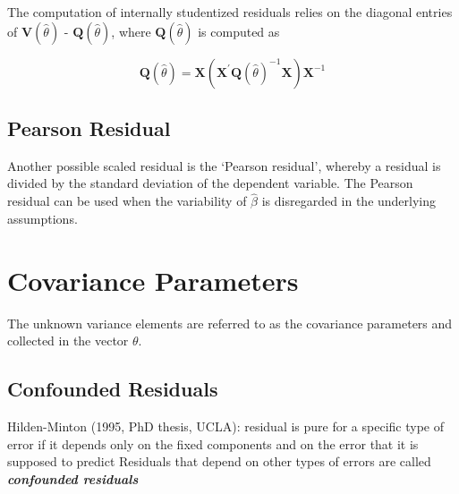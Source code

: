 \documentclass[Chap5amain.tex]{subfiles}
\begin{document}
The computation of internally studentized residuals relies on the diagonal entries of $\boldsymbol{V} (\hat{\theta})$ - $\boldsymbol{Q} (\hat{\theta})$, where $\boldsymbol{Q} (\hat{\theta})$ is computed as

\[ \boldsymbol{Q} (\hat{\theta}) = \boldsymbol{X} ( \boldsymbol{X}^{\prime}\boldsymbol{Q} (\hat{\theta})^{-1}\boldsymbol{X})\boldsymbol{X}^{-1} \]

\subsection{Pearson Residual}%

Another possible scaled residual is the  `Pearson residual', whereby a residual is divided by the standard deviation of the dependent variable. The Pearson residual can be used when the variability of $\hat{\beta}$ is disregarded in the underlying assumptions.

\newpage
\section{Covariance Parameters} %
The unknown variance elements are referred to as the covariance parameters and collected in the vector $\theta$.



\subsection{Confounded Residuals}
Hilden-Minton (1995, PhD thesis, UCLA): residual is pure for a
specific type of error if it depends only on the fixed components and
on the error that it is supposed to predict
Residuals that depend on other types of errors are called \textit{\textbf{confounded
residuals}}
\end{document}
